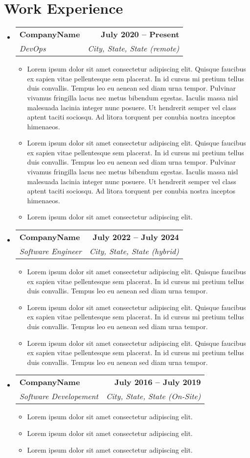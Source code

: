 \documentclass[letterpaper,11pt]{article}
\makeatletter
\newcommand{\resumeItem}[1]{
  \item\small{
    {#1 \vspace{0pt}}
  }
}
\newcommand{\resumeSubheading}[4]{
  \vspace{-2pt}\item
    \begin{tabular*}{1.0\textwidth}[t]{l@{\extracolsep{\fill}}r}
      \textbf{#1} & \textbf{\small #2} \\
      \textit{\small#3} & \textit{\small #4} \\
    \end{tabular*}\vspace{-7pt}
}
\newcommand{\resumeSubHeadingListStart}{\begin{itemize}[leftmargin=0.0in, label={}]}
\newcommand{\resumeSubHeadingListEnd}{\end{itemize}}\vspace{0pt}
\newcommand{\resumeItemListStart}{\begin{itemize}}
\newcommand{\resumeItemListEnd}{\end{itemize}\vspace{-5pt}}
\makeatother
\begin{document}
\section{Work Experience}
    \resumeSubHeadingListStart
                \resumeSubheading{CompanyName}{July 2020 -- Present}{DevOps}{City, State, State (remote)} 
                \resumeItemListStart
                    \resumeItem{Lorem ipsum dolor sit amet consectetur adipiscing elit. Quisque faucibus ex sapien vitae pellentesque sem placerat. In id cursus mi pretium tellus duis convallis. Tempus leo eu aenean sed diam urna tempor. Pulvinar vivamus fringilla lacus nec metus bibendum egestas. Iaculis massa nisl malesuada lacinia integer nunc posuere. Ut hendrerit semper vel class aptent taciti sociosqu. Ad litora torquent per conubia nostra inceptos himenaeos.}
                    \resumeItem{Lorem ipsum dolor sit amet consectetur adipiscing elit. Quisque faucibus ex sapien vitae pellentesque sem placerat. In id cursus mi pretium tellus duis convallis. Tempus leo eu aenean sed diam urna tempor. Pulvinar vivamus fringilla lacus nec metus bibendum egestas. Iaculis massa nisl malesuada lacinia integer nunc posuere. Ut hendrerit semper vel class aptent taciti sociosqu. Ad litora torquent per conubia nostra inceptos himenaeos.}
                    \resumeItem{Lorem ipsum dolor sit amet consectetur adipiscing elit.}
                    \resumeItemListEnd
            \resumeSubheading{CompanyName}{July 2022 -- July 2024}{Software Engineer}{City, State, State (hybrid)} 
                \resumeItemListStart
                    \resumeItem{Lorem ipsum dolor sit amet consectetur adipiscing elit. Quisque faucibus ex sapien vitae pellentesque sem placerat. In id cursus mi pretium tellus duis convallis. Tempus leo eu aenean sed diam urna tempor.}
                    \resumeItem{Lorem ipsum dolor sit amet consectetur adipiscing elit. Quisque faucibus ex sapien vitae pellentesque sem placerat. In id cursus mi pretium tellus duis convallis. Tempus leo eu aenean sed diam urna tempor.}
                    \resumeItem{Lorem ipsum dolor sit amet consectetur adipiscing elit. Quisque faucibus ex sapien vitae pellentesque sem placerat. In id cursus mi pretium tellus duis convallis. Tempus leo eu aenean sed diam urna tempor.}
                    \resumeItemListEnd
            \resumeSubheading{CompanyName}{July 2016 -- July 2019}{Software Developement}{City, State, State (On-Site)}
                \resumeItemListStart
                    \resumeItem{Lorem ipsum dolor sit amet consectetur adipiscing elit.}
                    \resumeItem{Lorem ipsum dolor sit amet consectetur adipiscing elit.}
                    \resumeItem{Lorem ipsum dolor sit amet consectetur adipiscing elit.}
                    \resumeItemListEnd
    \resumeSubHeadingListEnd
    \vspace{-12pt}
\end{document}
